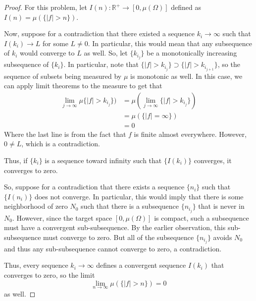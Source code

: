 \documentclass[fontsize=11pt]{scrartcl} %
\numberwithin{equation}{section} %
\numberwithin{figure}{section} %
\numberwithin{table}{section} %
\newcommand{\R}{\mathbb{R}}
\begin{document}
\begin{proof}
For this problem, let $I(n): \R^{+}\to [0,\mu(\Omega)]$ defined as $I(n) = \mu(\{|f|>n\})$.

Now, suppose for a contradiction that there existed a sequence $k_i\to\infty$ such that
$I(k_i)\to L$ for some $L\neq 0$. In particular, this would mean that any subsequence
of $k_i$ would converge to $L$ as well. So, let $\{k_{i_j}\}$ be a monotonically increasing
subsequence of $\{k_i\}$. In particular, note that $\{|f| > k_{i_j}\}\supset\{|f| > k_{i_{j+1}}\}$,
so the sequence of subsets being measured by $\mu$ is monotonic as well. In this case,
we can apply limit theorems to the measure to get that
\[
\begin{aligned}
\lim_{j\to\infty} \mu\{|f| > k_{i_j}\}) &= \mu\left(\lim_{j\to\infty} \{|f| > k_{i_j}\}\right)\\
                                        &= \mu(\{|f| = \infty\})\\
                                        &= 0
\end{aligned}
\]
Where the last line is from the fact that $f$ is finite almost everywhere.
However, $0\neq L$, which is a contradiction.

Thus, if $\{k_i\}$ is a sequence toward infinity such that $\{I(k_i)\}$ converges, it converges
to zero.

So, suppose for a contradiction that there exists a sequence $\{n_i\}$ such that $\{I(n_i)\}$
does not converge. In particular, this would imply that there is some neighborhood of zero $N_0$
such that there is a subsequence $\{n_{i_j}\}$ that is never in $N_0$. However,
since the target space $[0,\mu(\Omega)]$ is compact, such a subsequence must have a convergent
sub-subsequence. By the earlier observation, this sub-subsequence must converge to zero. But 
all of the subsequence $\{n_{i_j}\}$ avoids $N_0$ and thus any sub-subsequence cannot converge
to zero, a contradiction.

Thus, every sequence $k_i\to\infty$ defines a convergent sequence $I(k_i)$ that converges
to zero, so the limit 
\[
\lim_{n\to\infty} \mu(\{|f|> n\}) = 0
\]
as well.
\end{proof}
\end{document}
